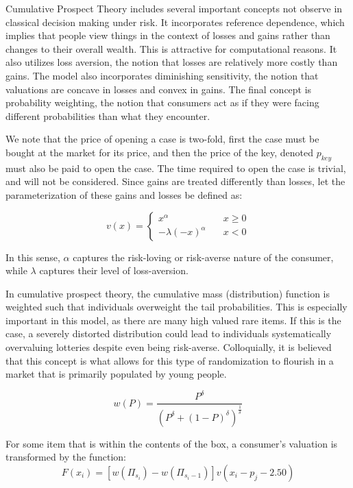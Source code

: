 \documentclass[12pt]{paper}
\newcommand{\brak}[1]{ \left [ #1 \right ] }
\begin{document}
Cumulative Prospect Theory includes several important concepts not
observe in classical decision making under risk. It incorporates
reference dependence, which implies that people view things in the
context of losses and gains rather than changes to their overall
wealth. This is attractive for computational reasons. It also utilizes
loss aversion, the notion that losses are relatively more costly than
gains. The model also incorporates diminishing sensitivity, the notion
that valuations are concave in losses and convex in gains. The final
concept is probability weighting, the notion that consumers act as if
they were facing different probabilities than what they encounter.

We note that the price of opening a case is two-fold, first the case
must be bought at the market for its price, and then the price of the
key, denoted $p_{key}$ must also be paid to open the case. The time
required to open the case is trivial, and will not be
considered. Since gains are treated differently than losses, let the
parameterization of these gains and losses be defined as:

\begin{equation*}
  v(x) =
  \begin{cases}
    x^\alpha \quad &x \geq 0\\
    -\lambda(-x)^\alpha \quad &x < 0
  \end{cases}
\end{equation*}

In this sense, $\alpha$ captures the risk-loving or risk-averse nature of
the consumer, while $\lambda$ captures their level of loss-aversion.


In cumulative prospect theory, the cumulative mass (distribution)
function is weighted such that individuals overweight the tail
probabilities. This is especially important in this model, as there are
many high valued rare items. If this is the case, a severely distorted
distribution could lead to individuals systematically overvaluing
lotteries despite even being risk-averse. Colloquially, it is believed
that this concept is what allows for this type of randomization to
flourish in a market that is primarily populated by young people.

\begin{equation*}
  w(P) = \frac{ P^\delta }{( P^\delta + (1-P)^\delta )^{\frac{1}{\delta}}}
\end{equation*}

For some item that is within the contents of the box, a consumer's
valuation is transformed by the function:
\begin{equation*}
F(x_i) = \brak{w( \Pi_{s_i}) - w(\Pi_{s_i - 1}) } v( x_i - p_j - 2.50)
\end{equation*}
\end{document}
